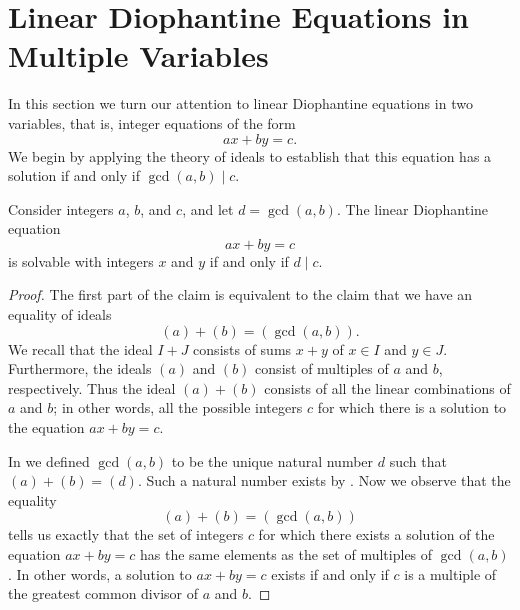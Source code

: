\section{Linear Diophantine Equations in Multiple Variables}

In this section we turn our attention to linear Diophantine equations in two variables, that is, integer equations of the form
\begin{equation*}
  ax + by = c.
\end{equation*}
We begin by applying the theory of ideals to establish that this equation has a solution if and only if $\gcd(a,b)\mid c$.

\begin{theorem}\label{theorem:solve-linear-diophantine-equation}
  Consider integers $a$, $b$, and $c$, and let $d=\gcd(a,b)$. The linear Diophantine equation
  \begin{equation*}
    ax + by = c
  \end{equation*}
  is solvable with integers $x$ and $y$ if and only if $d\mid c$.
\end{theorem}

\begin{proof}
  The first part of the claim is equivalent to the claim that we have an equality of ideals
  \begin{equation*}
    (a)+(b) = (\gcd(a,b)).
  \end{equation*}
  We recall that the ideal $I+J$ consists of sums $x+y$ of $x\in I$ and $y\in J$. Furthermore, the ideals $(a)$ and $(b)$ consist of multiples of $a$ and $b$, respectively. Thus the ideal $(a)+(b)$ consists of all the linear combinations of $a$ and $b$; in other words, all the possible integers $c$ for which there is a solution to the equation $ax+by=c$.

  In  we defined $\gcd(a,b)$ to be the unique natural number $d$ such that $(a)+(b)=(d)$. Such a natural number exists by . Now we observe that the equality
  \begin{equation*}
    (a)+(b)=(\gcd(a,b))
  \end{equation*}
  tells us exactly that the set of integers $c$ for which there exists a solution of the equation $ax+by=c$ has the same elements as the set of multiples of $\gcd(a,b)$. In other words, a solution to $ax+by=c$ exists if and only if $c$ is a multiple of the greatest common divisor of $a$ and $b$.
\end{proof}

